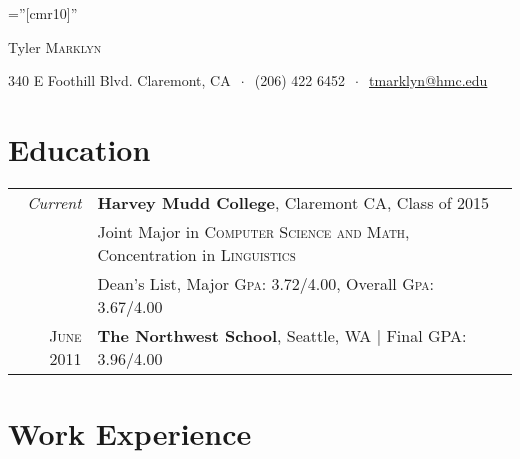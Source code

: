 \documentclass[letterpaper,10pt]{article} %
\begin{document}
\pagestyle{empty} %

\font\fb=''[cmr10]'' %

\begin{center}
{\Huge Tyler \textsc{Marklyn}\bigskip }%

\vspace{-5mm}
340 E Foothill Blvd. Claremont, CA  $\ \cdot \ $
 (206) 422 6452 $\ \cdot \ $ 
\href{mailto:tmarklyn@hmc.edu}{tmarklyn@hmc.edu}
\end{center}



\section{Education}

\begin{tabular}{rl}	
\emph{Current} & \textbf{Harvey Mudd College}, Claremont CA, Class of 2015\\
& Joint Major in \textsc{Computer Science and Math}, Concentration in \textsc{Linguistics} \\
& Dean's List, Major \textsc{Gpa}: 3.72/4.00, Overall \textsc{Gpa}: 3.67/4.00\\


\textsc{June} 2011& \textbf{The Northwest School}, Seattle, WA | Final GPA: 3.96/4.00
\end{tabular}


\section{Work Experience}
\end{document}
